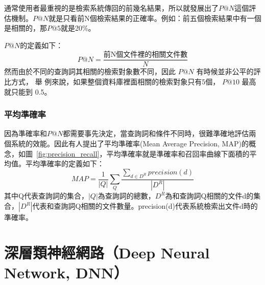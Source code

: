 通常使用者最重視的是檢索系統傳回的前幾名結果，所以就發展出了$P@N$這個評估機制。$P@N$就是只看前N個檢索結果的正確率。例如：前五個檢索結果中有一個是相關的，那$P@5$就是20\%。

$P@N$的定義如下：
\[
P@N=\frac{\text{前N個文件裡的相關文件數}}{N}
\]
 然而由於不同的查詢詞其相關的檢索對象數不同，因此 $P@N$ 有時候並非公平的評比方式， 舉
 例來說，如果整個資料庫裡面相關的檢索對象只有5個， $P@10$ 最高就只能到
 0.5。
\subsubsection{平均準確率~\cite{garofolo2000trec}}

因為準確率和$P@N$都需要事先決定，當查詢詞和條件不同時，很難準確地評估兩個系統的效能。因此有人提出了平均準確率(Mean Average Precision, MAP)的概念，如圖~\ref{fig:precision_recall}，平均準確率就是準確率和召回率曲線下面積的平均值。平均準確率的定義如下：
\begin{equation}
MAP = \frac{1}{|Q|} \sum_Q \frac{\sum_{d \in D^R}precision(d)}{|D^R|}
\end{equation}
其中Q代表查詢詞的集合，$|Q|$為查詢詞的總數，$D^R$為和查詢詞Q相關的文件d的集合，$|D^R|$代表和查詢詞Q相關的文件數量。precision(d)代表系統檢索出文件d時的準確率。




\section{深層類神經網路（Deep Neural Network, DNN）}
